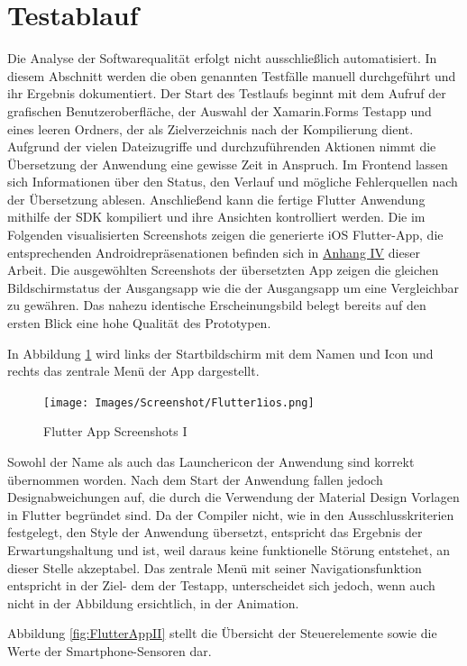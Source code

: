 \section{Testablauf}
Die Analyse der Softwarequalität erfolgt nicht ausschließlich automatisiert.  In diesem Abschnitt werden die oben genannten Testfälle manuell durchgeführt und ihr Ergebnis dokumentiert.
Der Start  des Testlaufs beginnt mit dem Aufruf der grafischen Benutzeroberfläche,   der Auswahl der Xamarin.Forms Testapp und eines leeren Ordners, der als Zielverzeichnis nach der Kompilierung dient. 
Aufgrund der vielen Dateizugriffe und durchzuführenden Aktionen nimmt die Übersetzung der Anwendung eine gewisse Zeit in Anspruch. Im Frontend lassen sich Informationen über den Status, den Verlauf und mögliche Fehlerquellen nach der Übersetzung ablesen.  Anschließend kann die fertige Flutter Anwendung mithilfe der SDK kompiliert und ihre Ansichten kontrolliert werden.  Die im Folgenden visualisierten Screenshots zeigen die generierte iOS Flutter-App,  die entsprechenden Androidrepräsenationen befinden sich in  \hyperref[chap:AnhangAndroidScreenshotsFlutter]{Anhang IV} dieser Arbeit.  Die ausgewöhlten Screenshots der übersetzten App zeigen die gleichen Bildschirmstatus der Ausgangsapp wie die der Ausgangsapp um eine Vergleichbar zu gewähren.  Das nahezu identische Erscheinungsbild belegt bereits auf den ersten Blick eine hohe Qualität des Prototypen.  

In Abbildung \ref{fig:FlutterAppI} wird links der Startbildschirm mit dem Namen und Icon und rechts das zentrale Menü der App dargestellt. 

\begin{figure}[!ht]
 \texttt{[image: Images/Screenshot/Flutter1ios.png]}
 \caption{Flutter App Screenshots I}
 \label{fig:FlutterAppI}
\end{figure}
 Sowohl der Name als auch das Launchericon der Anwendung sind korrekt übernommen worden.  Nach dem Start der Anwendung fallen jedoch Designabweichungen auf, die durch die Verwendung der Material Design Vorlagen in Flutter begründet sind.  Da der Compiler nicht,  wie in den Ausschlusskriterien festgelegt, den Style der Anwendung übersetzt,  entspricht das Ergebnis der Erwartungshaltung und ist,  weil daraus keine funktionelle Störung
entstehet,  an dieser Stelle akzeptabel.  Das zentrale Menü mit seiner Navigationsfunktion entspricht in der Ziel- dem der Testapp,  
unterscheidet sich jedoch,  wenn auch nicht in der Abbildung ersichtlich,  in der Animation. 

Abbildung \ref{fig:FlutterAppII} stellt die Übersicht der Steuerelemente sowie die Werte der Smartphone-Sensoren dar.

